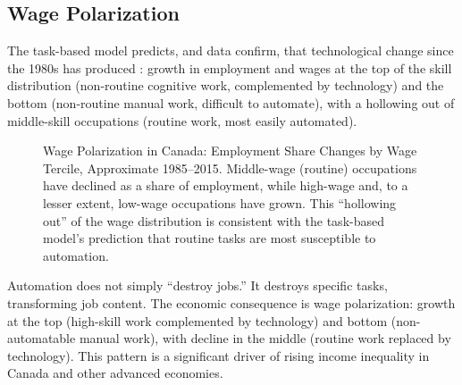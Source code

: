 \subsection{Wage Polarization}

The task-based model predicts, and data confirm, that technological change since the 1980s has produced : growth in employment and wages at the top of the skill distribution (non-routine cognitive work, complemented by technology) and the bottom (non-routine manual work, difficult to automate), with a hollowing out of middle-skill occupations (routine work, most easily automated).

\begin{figure}[H]
\centering
{}
\caption{Wage Polarization in Canada: Employment Share Changes by Wage Tercile,
  Approximate 1985--2015. Middle-wage (routine) occupations have declined as a share of
  employment, while high-wage and, to a lesser extent, low-wage occupations have grown.
  This ``hollowing out'' of the wage distribution is consistent with the task-based
  model's prediction that routine tasks are most susceptible to automation.}
\label{fig:polarization}
\end{figure}

\begin{keytakeaway}
Automation does not simply ``destroy jobs.'' It destroys specific tasks, transforming job content. The economic consequence is wage polarization: growth at the top (high-skill work complemented by technology) and bottom (non-automatable manual work), with decline in the middle (routine work replaced by technology). This pattern is a significant driver of rising income inequality in Canada and other advanced economies.
\end{keytakeaway}

